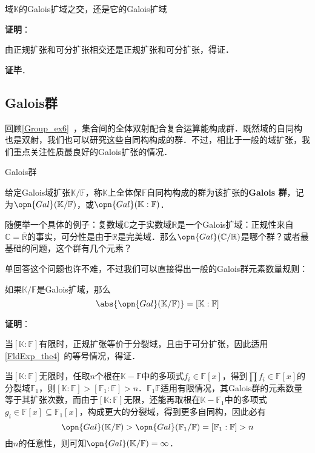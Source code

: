 \begin{theorem}{}
域$\mathbb{K}$的Galois扩域之交，还是它的Galois扩域
\end{theorem}

\textbf{证明}：

由正规扩张和可分扩张相交还是正规扩张和可分扩张，得证．

\textbf{证毕}．



\subsection{Galois群}

回顾\autoref{Group_ex6}~，集合间的全体双射配合复合运算能构成群．既然域的自同构也是双射，我们也可以研究这些自同构构成的群．不过，相比于一般的域扩张，我们重点关注性质最良好的Galois扩张的情况．

\begin{definition}{Galois群}\label{GExt_def2}

给定Galois域扩张$\mathbb{K}/\mathbb{F}$，称$\mathbb{K}$上全体保$\mathbb{F}$自同构构成的群为该扩张的\textbf{Galois 群}，记为$\opn{Gal}(\mathbb{K}/\mathbb{F})$，或$\opn{Gal}(\mathbb{K}:\mathbb{F})$．

\end{definition}


随便举一个具体的例子：复数域$\mathbb{C}$之于实数域$\mathbb{R}$是一个Galois扩域：正规性来自$\mathbb{C}=\overline{\mathbb{R}}$的事实，可分性是由于$\mathbb{R}$是完美域．那么$\opn{Gal}(\mathbb{C}/\mathbb{R})$是哪个群？或者最基础的问题，这个群有几个元素？

单回答这个问题也许不难，不过我们可以直接得出一般的Galois群元素数量规则：

\begin{theorem}{}\label{GExt_the2}
如果$\mathbb{K}/\mathbb{F}$是Galois扩域，那么
\begin{equation}
\abs{\opn{Gal}(\mathbb{K}/\mathbb{F})} = [\mathbb{K}:\mathbb{F}]
\end{equation}
\end{theorem}

\textbf{证明}：

当$[\mathbb{K}:\mathbb{F}]$有限时，正规扩张等价于分裂域，且由于可分扩张，因此适用\autoref{FldExp_the4}~的等号情况，得证．

当$[\mathbb{K}:\mathbb{F}]$无限时，任取$n$个根在$\mathbb{K}-\mathbb{F}$中的多项式$f_i\in\mathbb{F}[x]$，得到$\prod f_i\in\mathbb{F}[x]$的分裂域$\mathbb{F}_1$，则$[\mathbb{K}:\mathbb{F}]>[\mathbb{F}_1:\mathbb{F}]>n$．$\mathbb{F}_1\mathbb{F}$适用有限情况，其Galois群的元素数量等于其扩张次数，而由于$[\mathbb{K}:\mathbb{F}]$无限，还能再取根在$\mathbb{K}-\mathbb{F}_1$中的多项式$g_i\in\mathbb{F}[x]\subseteq \mathbb{F}_1[x]$，构成更大的分裂域，得到更多自同构，因此必有
\begin{equation}
\opn{Gal}(\mathbb{K}/\mathbb{F})>\opn{Gal}(\mathbb{F}_1/\mathbb{F})=[\mathbb{F}_1:\mathbb{F}]>n
\end{equation}
由$n$的任意性，则可知$\opn{Gal}(\mathbb{K}/\mathbb{F})=\infty$．

